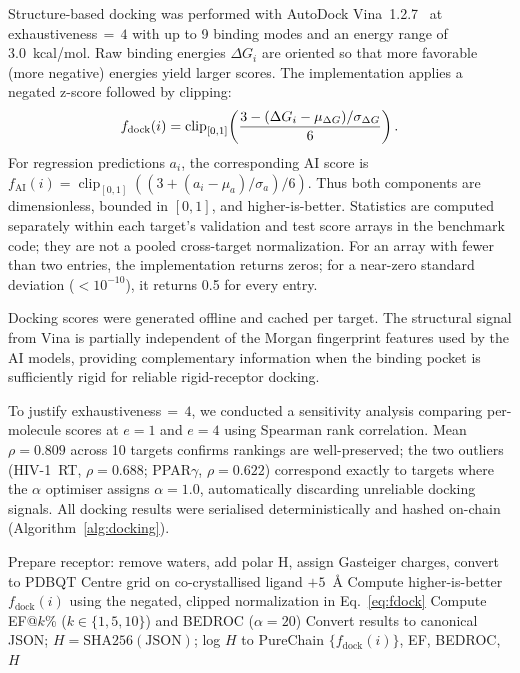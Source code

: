\documentclass[conference]{IEEEtran}
\newcommand{\rev}[2]{#2}
\begin{document}
Structure-based docking was performed with AutoDock
Vina~1.2.7~\cite{eberhardt2021autodock} at
exhaustiveness$\,{=}\,4$ with up to 9 binding modes and
an energy range of 3.0~kcal/mol.
\rev{R2.3}{Raw binding energies $\Delta G_i$ are oriented so that
more favorable (more negative) energies yield larger scores. The
implementation applies a negated z-score followed by clipping:}
\begin{equation}
\label{eq:fdock}
\textcolor{black}{f_{\mathrm{dock}}(i)
 = \operatorname{clip}_{[0,1]}\!\left(
 \frac{3-(\Delta G_i-\mu_{\Delta G})/\sigma_{\Delta G}}{6}\right).}
\end{equation}
\rev{R2.3}{For regression predictions $a_i$, the corresponding
AI score is $f_{\mathrm{AI}}(i)=\operatorname{clip}_{[0,1]}
((3+(a_i-\mu_a)/\sigma_a)/6)$. Thus both components are
dimensionless, bounded in $[0,1]$, and higher-is-better. Statistics
are computed separately within each target's validation and test
score arrays in the benchmark code; they are not a pooled
cross-target normalization. For an array with fewer than two entries,
the implementation returns zeros; for a near-zero standard deviation
($<10^{-10}$), it returns 0.5 for every entry.}


Docking scores were generated offline and cached per target.
The structural signal from Vina is partially independent
of the Morgan fingerprint features used by the AI models,
providing complementary information when the binding pocket
is sufficiently rigid for reliable rigid-receptor docking.

To justify exhaustiveness$\,{=}\,4$, we conducted a
sensitivity analysis comparing per-molecule scores at
$e{=}1$ and $e{=}4$ using Spearman rank correlation.
Mean $\rho = 0.809$ across 10 targets confirms rankings
are well-preserved; the two outliers (HIV-1~RT,
$\rho=0.688$; PPAR$\gamma$, $\rho=0.622$) correspond
exactly to targets where the $\alpha$ optimiser assigns
$\alpha=1.0$, automatically discarding unreliable
docking signals.
All docking results were serialised deterministically
and hashed on-chain (Algorithm~\ref{alg:docking}).

\begin{algorithm}[!htbp]
\scriptsize
\caption{Structure-Based Docking and Enrichment Evaluation}
\label{alg:docking}
Prepare receptor: remove waters, add polar H,
  assign Gasteiger charges, convert to PDBQT\;
Centre grid on co-crystallised ligand $+ 5$~\AA\;
\rev{R2.3}{Compute higher-is-better $f_{\mathrm{dock}}(i)$
  using the negated, clipped normalization in Eq.~\ref{eq:fdock}}\;
Compute EF@$k$\% ($k \in \{1,5,10\}$) and BEDROC
  ($\alpha = 20$)\;
Convert results to canonical JSON;
  $H = \mathrm{SHA256}(\mathrm{JSON})$;
  log $H$ to PureChain\;
\Return $\{f_{\mathrm{dock}}(i)\}$, EF, BEDROC, $H$\;
\end{algorithm}
\end{document}
